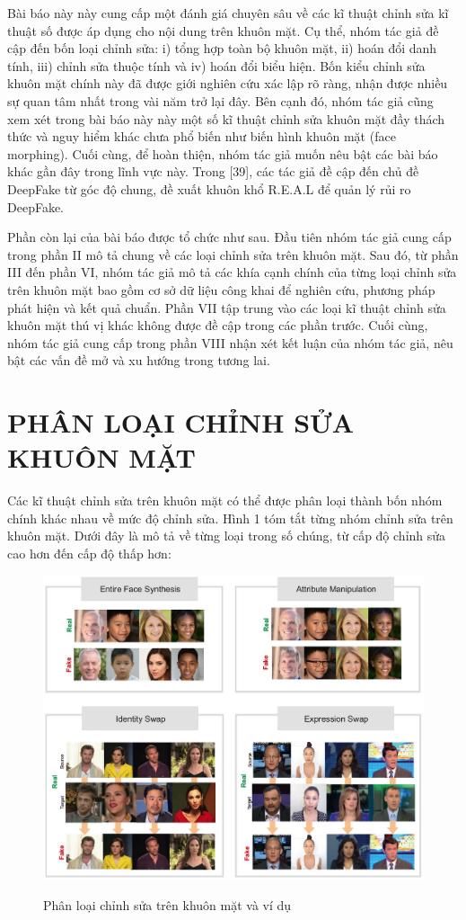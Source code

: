 \documentclass{article}
\begin{document}
Bài báo này này cung cấp một đánh giá chuyên sâu về các kĩ thuật chỉnh sửa kĩ thuật số được áp dụng cho nội dung trên khuôn mặt. Cụ thể, nhóm tác giả đề cập đến bốn loại chỉnh sửa: i) tổng hợp toàn bộ khuôn mặt, ii) hoán đổi danh tính, iii) chỉnh sửa thuộc tính và iv) hoán đổi biểu hiện. Bốn kiểu chỉnh sửa khuôn mặt chính này đã được giới nghiên cứu xác lập rõ ràng, nhận được nhiều sự quan tâm nhất trong vài năm trở lại đây. Bên cạnh đó, nhóm tác giả cũng xem xét trong bài báo này này một số kĩ thuật chỉnh sửa khuôn mặt đầy thách thức và nguy hiểm khác chưa phổ biến như biến hình khuôn mặt (face morphing). Cuối cùng, để hoàn thiện, nhóm tác giả muốn nêu bật các bài báo khác gần đây trong lĩnh vực này. Trong [39], các tác giả đề cập đến chủ đề DeepFake từ góc độ chung, đề xuất khuôn khổ R.E.A.L để quản lý rủi ro DeepFake.

Phần còn lại của bài báo được tổ chức như sau. Đầu tiên nhóm tác giả cung cấp trong phần II mô tả chung về các loại chỉnh sửa trên khuôn mặt. Sau đó, từ phần III đến phần VI, nhóm tác giả mô tả các khía cạnh chính của từng loại chỉnh sửa trên khuôn mặt bao gồm cơ sở dữ liệu công khai để nghiên cứu, phương pháp phát hiện và kết quả chuẩn. Phần VII tập trung vào các loại kĩ thuật chỉnh sửa khuôn mặt thú vị khác không được đề cập trong các phần trước. Cuối cùng, nhóm tác giả cung cấp trong phần VIII nhận xét kết luận của nhóm tác giả, nêu bật các vấn đề mở và xu hướng trong tương lai.


\section{PHÂN LOẠI CHỈNH SỬA KHUÔN MẶT} \label{sec:2-category}

Các kĩ thuật chỉnh sửa trên khuôn mặt có thể được phân loại thành bốn nhóm chính khác nhau về mức độ chỉnh sửa. Hình 1 tóm tắt từng nhóm chỉnh sửa trên khuôn mặt. Dưới đây là mô tả về từng loại trong số chúng, từ cấp độ chỉnh sửa cao hơn đến cấp độ thấp hơn:


\begin{figure}[h!]
\caption{Phân loại chỉnh sửa trên khuôn mặt và ví dụ}
\includegraphics[width=\columnwidth]{fig-1-category-and-example}
\label{category-and-example}
\end{figure}
\end{document}

